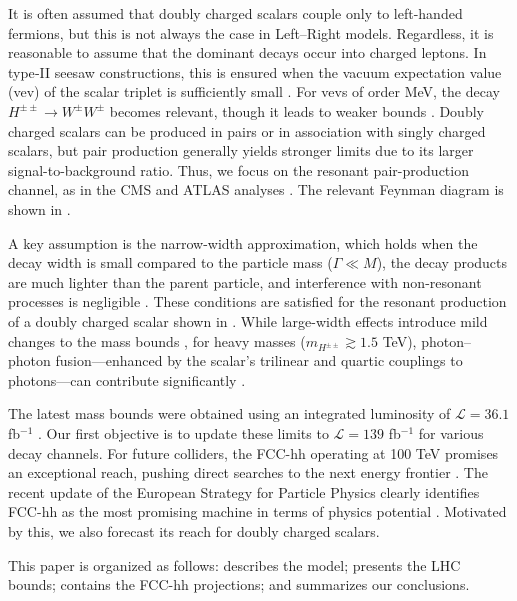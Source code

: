 \documentclass[aps, prev, twocolumn, preprintnumbers, floatfix, nofootinbib]{revtex4-1}
\begin{document}
It is often assumed that doubly charged scalars couple only to left-handed fermions, but this is not always the case in Left--Right models. Regardless, it is reasonable to assume that the dominant decays occur into charged leptons. In type‑II seesaw constructions, this is ensured when the vacuum expectation value (vev) of the scalar triplet is sufficiently small \cite{Perez:2008ha}. For vevs of order MeV, the decay $H^{\pm\pm}\rightarrow W^{\pm}W^{\pm}$ becomes relevant, though it leads to weaker bounds \cite{ATLAS:2018ceg}. Doubly charged scalars can be produced in pairs or in association with singly charged scalars, but pair production generally yields stronger limits due to its larger signal-to-background ratio. Thus, we focus on the resonant pair-production channel, as in the CMS and ATLAS analyses \cite{CMS:2012kua, ATLAS:2012hi, Chatrchyan:2012ya, ATLAS:2014kca, ATLAS:2016pbt, CMS:2016cpz, CMS:2017pet, Aaboud:2017qph}. The relevant Feynman diagram is shown in .

A key assumption is the narrow-width approximation, which holds when the decay width is small compared to the particle mass ($\Gamma \ll M$), the decay products are much lighter than the parent particle, and interference with non-resonant processes is negligible \cite{delaMadrid:2017oeo, Berdine:2007uv}. These conditions are satisfied for the resonant production of a doubly charged scalar shown in . While large-width effects introduce mild changes to the mass bounds \cite{Crivellin:2018ahj}, for heavy masses ($m_{H^{\pm\pm}} \gtrsim 1.5$ TeV), photon--photon fusion—enhanced by the scalar's trilinear and quartic couplings to photons—can contribute significantly \cite{Babu:2016rcr, Crivellin:2018ahj}.

The latest mass bounds were obtained using an integrated luminosity of $\mathcal{L}=36.1$ fb$^{-1}$ \cite{ATLAS:2017xqs}. Our first objective is to update these limits to $\mathcal{L}=139$ fb$^{-1}$ for various decay channels. For future colliders, the FCC-hh operating at 100 TeV promises an exceptional reach, pushing direct searches to the next energy frontier \cite{FCC:2025lpp, FCC:2025uan, FCC:2025jtd}. The recent update of the European Strategy for Particle Physics clearly identifies FCC-hh as the most promising machine in terms of physics potential \cite{deBlas:2025gyz}. Motivated by this, we also forecast its reach for doubly charged scalars.

This paper is organized as follows:  describes the model;  presents the LHC bounds;  contains the FCC-hh projections; and  summarizes our conclusions.
\end{document}
